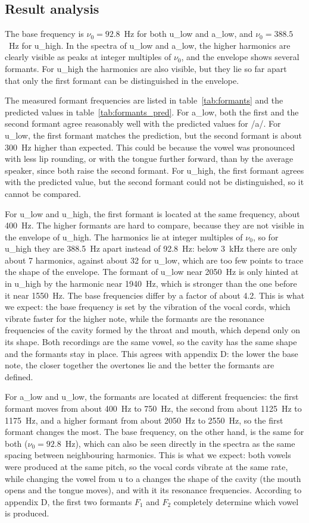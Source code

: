 \subsection{Result analysis}
The base frequency is $\nu_0 = 92.8$~Hz for both u\_low and a\_low, and $\nu_0 = 388.5$~Hz for u\_high. In the spectra of u\_low and a\_low, the higher harmonics are clearly visible as peaks at integer multiples of $\nu_0$, and the envelope shows several formants. For u\_high the harmonics are also visible, but they lie so far apart that only the first formant can be distinguished in the envelope.

The measured formant frequencies are listed in table~\ref{tab:formants} and the predicted values in table~\ref{tab:formants_pred}. For a\_low, both the first and the second formant agree reasonably well with the predicted values for /a/. For u\_low, the first formant matches the prediction, but the second formant is about 300~Hz higher than expected. This could be because the vowel was pronounced with less lip rounding, or with the tongue further forward, than by the average speaker, since both raise the second formant. For u\_high, the first formant agrees with the predicted value, but the second formant could not be distinguished, so it cannot be compared.

For u\_low and u\_high, the first formant is located at the same frequency, about 400~Hz. The higher formants are hard to compare, because they are not visible in the envelope of u\_high. The harmonics lie at integer multiples of $\nu_0$, so for u\_high they are 388.5~Hz apart instead of 92.8~Hz: below 3~kHz there are only about 7 harmonics, against about 32 for u\_low, which are too few points to trace the shape of the envelope. The formant of u\_low near 2050~Hz is only hinted at in u\_high by the harmonic near 1940~Hz, which is stronger than the one before it near 1550~Hz. The base frequencies differ by a factor of about 4.2. This is what we expect: the base frequency is set by the vibration of the vocal cords, which vibrate faster for the higher note, while the formants are the resonance frequencies of the cavity formed by the throat and mouth, which depend only on its shape. Both recordings are the same vowel, so the cavity has the same shape and the formants stay in place. This agrees with appendix D: the lower the base note, the closer together the overtones lie and the better the formants are defined.

For a\_low and u\_low, the formants are located at different frequencies: the first formant moves from about 400~Hz to 750~Hz, the second from about 1125~Hz to 1175~Hz, and a higher formant from about 2050~Hz to 2550~Hz, so the first formant changes the most. The base frequency, on the other hand, is the same for both ($\nu_0 = 92.8$~Hz), which can also be seen directly in the spectra as the same spacing between neighbouring harmonics. This is what we expect: both vowels were produced at the same pitch, so the vocal cords vibrate at the same rate, while changing the vowel from u to a changes the shape of the cavity (the mouth opens and the tongue moves), and with it its resonance frequencies. According to appendix D, the first two formants $F_1$ and $F_2$ completely determine which vowel is produced.
